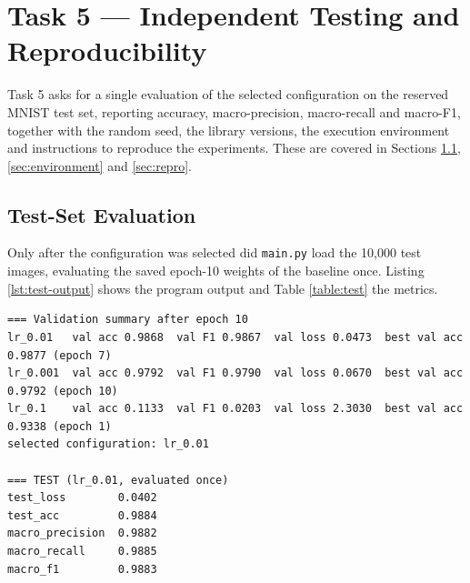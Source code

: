 \chapter{Task 5 --- Independent Testing and Reproducibility}
\label{ch:task5}


Task 5 asks for a single evaluation of the selected configuration on the
reserved MNIST test set, reporting accuracy, macro-precision,
macro-recall and macro-F1, together with the random seed, the library
versions, the execution environment and instructions to reproduce the
experiments. These are covered in Sections \ref{sec:task5},
\ref{sec:environment} and \ref{sec:repro}.

\section{Test-Set Evaluation}
\label{sec:task5}

Only after the configuration was selected did \texttt{main.py} load the
10,000 test images, evaluating the saved epoch-10 weights of the baseline
once. Listing \ref{lst:test-output} shows the program output and Table
\ref{table:test} the metrics.

\begin{lstlisting}[language={}, numbers=none, caption={Program output: model selection and the single test evaluation.}, label={lst:test-output}]
=== Validation summary after epoch 10
lr_0.01   val acc 0.9868  val F1 0.9867  val loss 0.0473  best val acc 0.9877 (epoch 7)
lr_0.001  val acc 0.9792  val F1 0.9790  val loss 0.0670  best val acc 0.9792 (epoch 10)
lr_0.1    val acc 0.1133  val F1 0.0203  val loss 2.3030  best val acc 0.9338 (epoch 1)
selected configuration: lr_0.01

=== TEST (lr_0.01, evaluated once)
test_loss        0.0402
test_acc         0.9884
macro_precision  0.9882
macro_recall     0.9885
macro_f1         0.9883
\end{lstlisting}

